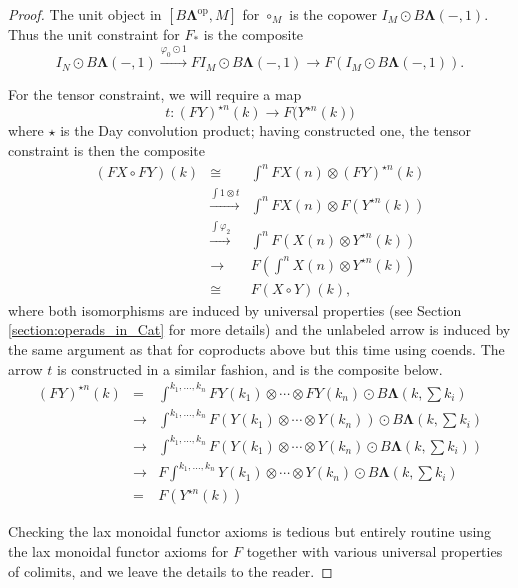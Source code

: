\documentclass{amsbook} %
\newcommand{\mb}{\mathbf}
\numberwithin{section}{chapter}
\begin{document}
\begin{proof}
The unit object in $[B\mb{\Lambda}^{\textrm{op}}, M]$ for $\circ_{M}$ is the copower $I_{M} \odot B\mb{\Lambda}(-,1)$.  Thus the unit constraint for $F_{*}$ is the composite
\[
I_{N} \odot B\mb{\Lambda}(-,1) \stackrel{\varphi_{0} \odot 1}{\longrightarrow} FI_{M} \odot B\mb{\Lambda}(-,1) \rightarrow F(I_{M} \odot B\mb{\Lambda}(-,1) ).
\]

For the tensor constraint, we will require a map
\[
t:(FY)^{\star n}(k) \rightarrow F\big(Y^{\star n}(k)\big)
\]
 where $\star$ is the Day convolution product; having constructed one, the tensor constraint is then the composite
\[
\begin{array}{rcl}
(FX \circ FY)(k) & \cong & \int^{n} FX(n) \otimes (FY)^{\star n}(k) \\
& \stackrel{ \int 1 \otimes t}{\longrightarrow}  & \int^{n} FX(n) \otimes F(Y^{\star n}(k)) \\
& \stackrel{\int \varphi_{2}}{\longrightarrow}  & \int^{n} F(X(n) \otimes Y^{\star n}(k)) \\
& \longrightarrow & F (\int^{n} X(n) \otimes Y^{\star n}(k)) \\
& \cong & F(X \circ Y)(k),
\end{array}
\]
where both isomorphisms are induced by universal properties (see Section \ref{section:operads_in_Cat} for more details) and the unlabeled arrow is induced by the same argument as that for coproducts above but this time using coends.  The arrow $t$ is constructed in a similar fashion, and is the composite below.
\[
\begin{array}{rcl}
(FY)^{\star n}(k) & = & \int^{k_{1}, \ldots, k_{n}} FY(k_{1}) \otimes \cdots \otimes FY(k_{n}) \odot B\mb{\Lambda}(k, \sum k_{i}) \\
& \rightarrow &  \int^{k_{1}, \ldots, k_{n}} F(Y(k_{1}) \otimes \cdots \otimes Y(k_{n})) \odot B\mb{\Lambda}(k, \sum k_{i}) \\
& \rightarrow & \int^{k_{1}, \ldots, k_{n}} F(Y(k_{1}) \otimes \cdots \otimes Y(k_{n}) \odot B\mb{\Lambda}(k, \sum k_{i}) ) \\
& \rightarrow & F\int^{k_{1}, \ldots, k_{n}} Y(k_{1}) \otimes \cdots \otimes Y(k_{n}) \odot B\mb{\Lambda}(k, \sum k_{i})  \\
& = & F(Y^{\star n}(k))
\end{array}
\]

Checking the lax monoidal functor axioms is tedious but entirely routine using the lax monoidal functor axioms for $F$ together with various universal properties of colimits, and we leave the details to the reader.
\end{proof}
\end{document}
